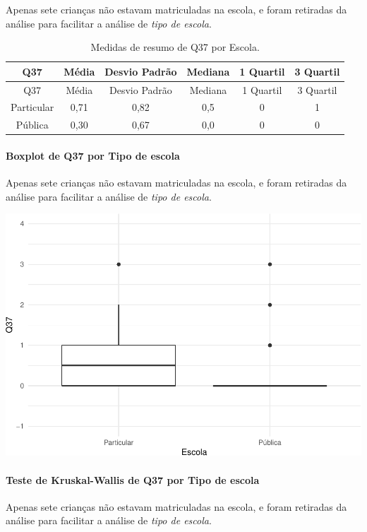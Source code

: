 \documentclass[]{article}
\let\oldparagraph\paragraph
\renewcommand{\paragraph}[1]{\oldparagraph{#1}\mbox{}}
\begin{document}
Apenas sete crianças não estavam matriculadas na escola, e foram retiradas da análise para facilitar a análise de \emph{tipo de escola}.

\begin{longtable}[]{@{}cccccc@{}}
\caption{\label{tab:unnamed-chunk-1413}Medidas de resumo de Q37 por Escola.}\tabularnewline
\toprule
Q37 & Média & Desvio Padrão & Mediana & 1 Quartil & 3 Quartil\tabularnewline
\midrule
\endfirsthead
\toprule
Q37 & Média & Desvio Padrão & Mediana & 1 Quartil & 3 Quartil\tabularnewline
\midrule
\endhead
Particular & 0,71 & 0,82 & 0,5 & 0 & 1\tabularnewline
Pública & 0,30 & 0,67 & 0,0 & 0 & 0\tabularnewline
\bottomrule
\end{longtable}

\hypertarget{boxplot-de-q37-por-tipo-de-escola}{%
\paragraph{Boxplot de Q37 por Tipo de escola}\label{boxplot-de-q37-por-tipo-de-escola}}

Apenas sete crianças não estavam matriculadas na escola, e foram retiradas da análise para facilitar a análise de \emph{tipo de escola}.

\begin{center}\includegraphics[width=0.75\linewidth]{relatorio_covid19_files/figure-latex/unnamed-chunk-1414-1} \end{center}

\hypertarget{teste-de-kruskal-wallis-de-q37-por-tipo-de-escola}{%
\paragraph{Teste de Kruskal-Wallis de Q37 por Tipo de escola}\label{teste-de-kruskal-wallis-de-q37-por-tipo-de-escola}}

Apenas sete crianças não estavam matriculadas na escola, e foram retiradas da análise para facilitar a análise de \emph{tipo de escola}.
\end{document}

